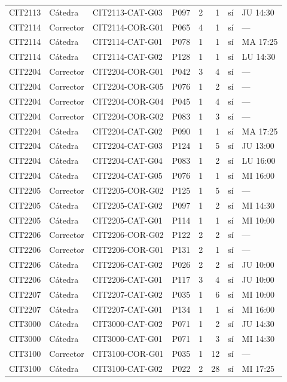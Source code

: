 \begin{longtable}{llllrrcl}
CIT2113 & Cátedra & CIT2113-CAT-G03 & P097 & 2 & 1 & sí & JU 14:30 \\
CIT2114 & Corrector & CIT2114-COR-G01 & P065 & 4 & 1 & sí & — \\
CIT2114 & Cátedra & CIT2114-CAT-G01 & P078 & 1 & 1 & sí & MA 17:25 \\
CIT2114 & Cátedra & CIT2114-CAT-G02 & P128 & 1 & 1 & sí & LU 14:30 \\
CIT2204 & Corrector & CIT2204-COR-G01 & P042 & 3 & 4 & sí & — \\
CIT2204 & Corrector & CIT2204-COR-G05 & P076 & 1 & 2 & sí & — \\
CIT2204 & Corrector & CIT2204-COR-G04 & P045 & 1 & 4 & sí & — \\
CIT2204 & Corrector & CIT2204-COR-G02 & P083 & 1 & 3 & sí & — \\
CIT2204 & Cátedra & CIT2204-CAT-G02 & P090 & 1 & 1 & sí & MA 17:25 \\
CIT2204 & Cátedra & CIT2204-CAT-G03 & P124 & 1 & 5 & sí & JU 13:00 \\
CIT2204 & Cátedra & CIT2204-CAT-G04 & P083 & 1 & 2 & sí & LU 16:00 \\
CIT2204 & Cátedra & CIT2204-CAT-G05 & P076 & 1 & 1 & sí & MI 16:00 \\
CIT2205 & Corrector & CIT2205-COR-G02 & P125 & 1 & 5 & sí & — \\
CIT2205 & Cátedra & CIT2205-CAT-G02 & P097 & 1 & 2 & sí & MI 14:30 \\
CIT2205 & Cátedra & CIT2205-CAT-G01 & P114 & 1 & 1 & sí & MI 10:00 \\
CIT2206 & Corrector & CIT2206-COR-G02 & P122 & 2 & 2 & sí & — \\
CIT2206 & Corrector & CIT2206-COR-G01 & P131 & 2 & 1 & sí & — \\
CIT2206 & Cátedra & CIT2206-CAT-G02 & P026 & 2 & 2 & sí & JU 10:00 \\
CIT2206 & Cátedra & CIT2206-CAT-G01 & P117 & 3 & 4 & sí & JU 10:00 \\
CIT2207 & Cátedra & CIT2207-CAT-G02 & P035 & 1 & 6 & sí & MI 10:00 \\
CIT2207 & Cátedra & CIT2207-CAT-G01 & P134 & 1 & 1 & sí & MI 16:00 \\
CIT3000 & Cátedra & CIT3000-CAT-G02 & P071 & 1 & 2 & sí & JU 14:30 \\
CIT3000 & Cátedra & CIT3000-CAT-G01 & P071 & 1 & 3 & sí & MI 14:30 \\
CIT3100 & Corrector & CIT3100-COR-G01 & P035 & 1 & 12 & sí & — \\
CIT3100 & Cátedra & CIT3100-CAT-G02 & P022 & 2 & 28 & sí & MI 17:25 \\

\end{longtable}
